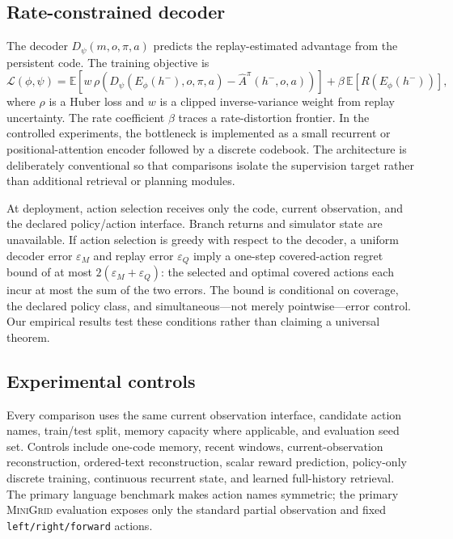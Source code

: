 \documentclass[11pt]{article}
\newcommand{\minigrid}{\textsc{MiniGrid}}
\begin{document}
\subsection{Rate-constrained decoder}
The decoder $D_\psi(m,o,\pi,a)$ predicts the replay-estimated advantage from the persistent code. The training objective is
\begin{equation}
\mathcal L(\phi,\psi)=
\mathbb E\left[w\,\rho\left(D_\psi(E_\phi(h^-),o,\pi,a)-\widehat A^\pi(h^-,o,a)\right)\right]
 +\beta\,\mathbb E[R(E_\phi(h^-))],
\end{equation}
where $\rho$ is a Huber loss and $w$ is a clipped inverse-variance weight from replay uncertainty. The rate coefficient $\beta$ traces a rate-distortion frontier. In the controlled experiments, the bottleneck is implemented as a small recurrent or positional-attention encoder followed by a discrete codebook. The architecture is deliberately conventional so that comparisons isolate the supervision target rather than additional retrieval or planning modules.

At deployment, action selection receives only the code, current observation, and the declared policy/action interface. Branch returns and simulator state are unavailable. If action selection is greedy with respect to the decoder, a uniform decoder error $\varepsilon_M$ and replay error $\varepsilon_Q$ imply a one-step covered-action regret bound of at most $2(\varepsilon_M+\varepsilon_Q)$: the selected and optimal covered actions each incur at most the sum of the two errors. The bound is conditional on coverage, the declared policy class, and simultaneous---not merely pointwise---error control. Our empirical results test these conditions rather than claiming a universal theorem.

\subsection{Experimental controls}
Every comparison uses the same current observation interface, candidate action names, train/test split, memory capacity where applicable, and evaluation seed set. Controls include one-code memory, recent windows, current-observation reconstruction, ordered-text reconstruction, scalar reward prediction, policy-only discrete training, continuous recurrent state, and learned full-history retrieval. The primary language benchmark makes action names symmetric; the primary \minigrid{} evaluation exposes only the standard partial observation and fixed \texttt{left/right/forward} actions.
\end{document}
